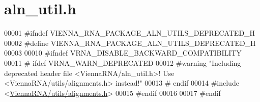\hypertarget{aln__util_8h_source}{}\section{aln\+\_\+util.\+h}
\label{aln__util_8h_source}

\begin{DoxyCode}
00001 \textcolor{preprocessor}{#ifndef VIENNA\_RNA\_PACKAGE\_ALN\_UTILS\_DEPRECATED\_H}
00002 \textcolor{preprocessor}{#define VIENNA\_RNA\_PACKAGE\_ALN\_UTILS\_DEPRECATED\_H}
00003 
00010 \textcolor{preprocessor}{#ifndef VRNA\_DISABLE\_BACKWARD\_COMPATIBILITY}
00011 \textcolor{preprocessor}{# ifdef VRNA\_WARN\_DEPRECATED}
00012 \textcolor{preprocessor}{#warning "Including deprecated header file <ViennaRNA/aln\_util.h>! Use <ViennaRNA/utils/alignments.h>
       instead!"}
00013 \textcolor{preprocessor}{# endif}
00014 \textcolor{preprocessor}{#include <\hyperlink{utils_2alignments_8h}{ViennaRNA/utils/alignments.h}>}
00015 \textcolor{preprocessor}{#endif}
00016 
00017 \textcolor{preprocessor}{#endif}
\end{DoxyCode}
